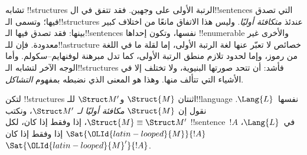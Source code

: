 \documentclass[../../../include/open-logic-section]{subfiles}
\begin{document}

تشابه !!{structure}s الرتبة الأولى على وجهين. فقد تتفق في
ال!!{sentence}s التي تصدق فيها؛ وتسمى الـ!!{structure}s عندئذ
\emph{متكافئة أوليًا}. وليس هذا الاتفاق مانعًا من اختلاف كبير
بينها: فقد تصدق فيها الـ!!{sentence}s نفسها، وتكون إحداها
!!{enumerable} والأخرى غير معدودة. فإن للـ!!a{structure} خصائص
لا تعبّر عنها لغة الرتبة الأولى، إما لقلة ما في اللغة من رموز،
وإما لحدود تلازم منطق الرتبة الأولى، كما تدل مبرهنة لوفنهايم--سكولم.
وأما الوجه الآخر لتشابه الـ!!{structure}s فأشد: أن تتحد صورتها
البنيوية، ولا تختلف إلا في الأشياء التي تتألف منها. وهذا هو
المعنى الذي نضبطه بمفهوم \emph{التشاكل}.

\begin{defn}
لتكن !!{structure}s اثنتان $\Struct{M}$ و$\Struct M'$ للـ!!{language}
نفسها~$\Lang{L}$. نقول إن $\Struct{M}$ \emph{مكافئة أوليًا لـ}
$\Struct M'$، ونكتب $\Struct{M} \equiv \Struct M'$، إذا وفقط إذا كان،
لكل !!{sentence}~$!A$ في~$\Lang{L}$، $\Sat{{\OLId{latin-looped}{M}}}{!A}$ إذا وفقط إذا كان
$\Sat{{\OLId{latin-looped}{M}}'}{!A}$.
\end{defn}
\end{document}
